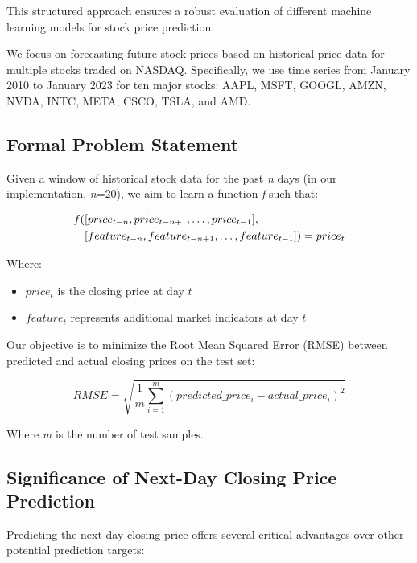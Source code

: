 \documentclass[sigconf]{acmart}
\begin{document}
This structured approach ensures a robust evaluation of different machine learning models for stock price prediction.

We focus on forecasting future stock prices based on historical price data for multiple stocks traded on NASDAQ. Specifically, we use time series from January 2010 to January 2023 for ten major stocks: AAPL, MSFT, GOOGL, AMZN, NVDA, INTC, META, CSCO, TSLA, and AMD.

\subsection{Formal Problem Statement}

Given a window of historical stock data for the past \textit{n} days (in our implementation, \textit{n}=20), we aim to learn a function \textit{f} such that:

\begin{align}
f(&[price_{t-n}, price_{t-n+1}, \ldots, price_{t-1}],\notag\\
&[feature_{t-n}, feature_{t-n+1}, \ldots, feature_{t-1}]) = price_t
\end{align}

Where:
\begin{itemize}
\item $price_t$ is the closing price at day $t$
\item $feature_t$ represents additional market indicators at day $t$
\end{itemize}

Our objective is to minimize the Root Mean Squared Error (RMSE) between predicted and actual closing prices on the test set:

\begin{equation}
RMSE = \sqrt{\frac{1}{m} \sum_{i=1}^{m} (predicted\_price_i - actual\_price_i)^2}
\end{equation}

Where \textit{m} is the number of test samples.

\subsection{Significance of Next-Day Closing Price Prediction}

Predicting the next-day closing price offers several critical advantages over other potential prediction targets:
\end{document}
